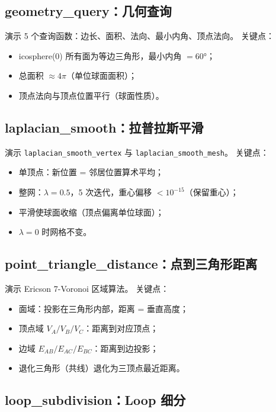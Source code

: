 \documentclass[11pt,a4paper]{article}
\begin{document}
\subsection{geometry\_query：几何查询}

演示 5 个查询函数：边长、面积、法向、最小内角、顶点法向。
关键点：
\begin{itemize}
  \item icosphere(0) 所有面为等边三角形，最小内角 $= 60°$；
  \item 总面积 $\approx 4\pi$（单位球面面积）；
  \item 顶点法向与顶点位置平行（球面性质）。
\end{itemize}

\subsection{laplacian\_smooth：拉普拉斯平滑}

演示 \texttt{laplacian\_smooth\_vertex} 与 \texttt{laplacian\_smooth\_mesh}。
关键点：
\begin{itemize}
  \item 单顶点：新位置 = 邻居位置算术平均；
  \item 整网：$\lambda=0.5$，5 次迭代，重心偏移 $< 10^{-15}$（保留重心）；
  \item 平滑使球面收缩（顶点偏离单位球面）；
  \item $\lambda=0$ 时网格不变。
\end{itemize}

\subsection{point\_triangle\_distance：点到三角形距离}

演示 Ericson 7-Voronoi 区域算法。
关键点：
\begin{itemize}
  \item 面域：投影在三角形内部，距离 = 垂直高度；
  \item 顶点域 $V_A/V_B/V_C$：距离到对应顶点；
  \item 边域 $E_{AB}/E_{AC}/E_{BC}$：距离到边投影；
  \item 退化三角形（共线）退化为三顶点最近距离。
\end{itemize}

\subsection{loop\_subdivision：Loop 细分}
\end{document}
